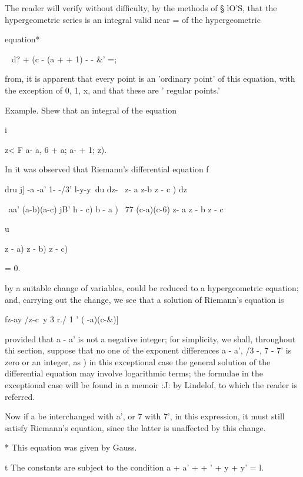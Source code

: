 
The reader will verify without difficulty, by the methods of § lO'S,
that the hypergeometric series is an integral valid near = of the
hypergeometric

equation*

   ~ d? + (c - (a + + 1) - - \&' =;

from, it is apparent that every point is an 'ordinary point' of
this equation, with the exception of 0, 1, x, and that these are '
regular points.'

Example. Shew that an integral of the equation

i

z< F a- a, 6 + a; a- + 1; z).


In it was observed that Riemann's differential equation f

dru j] -a -a' 1- -/3' l-y-y\ du dz- \ z- a z-b z - c ) dz

\ aa' (a-b)(a-c) jB' h - c) b - a ) \ 77 (c-a)(c-6) z- a z - b z - c

u

 z - a) z - b) z - c)

= 0.

by a suitable change of variables, could be reduced to a
hypergeometric equation; and, carrying out the change, we see that a
solution of Riemann's equation is

fz-ay /z-c\ y 3 r./ 1 ' ( -a)(c-\&)]

provided that a - a' is not a negative integer; for simplicity, we
shall, throughout thi section, suppose that no one of the exponent
differences a - a', /3 -, 7 - 7' is zero or an integer, as )
in this exceptional case the general solution of the differential
equation may involve logarithmic terms; the formulae in the
exceptional case will be found in a memoir :J: by Lindelof, to which
the reader is referred.

Now if a be interchanged with a', or 7 with 7', in this expression, it
must still satisfy Riemann's equation, since the latter is unaffected
by this change.

* This equation was given by Gauss.

t The constants are subject to the condition a + a' + + ' + y + y' =
l.

